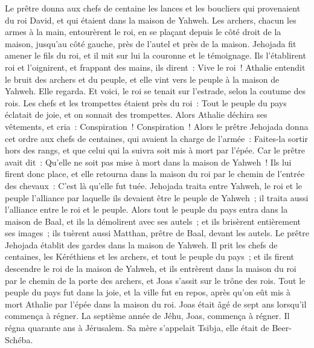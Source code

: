 \begin{multicols}{2}
Le prêtre donna aux chefs de centaine les lances et les boucliers qui provenaient du roi David, et qui étaient dans la maison de Yahweh.
Les archers, chacun les armes à la main, entourèrent le roi, en se plaçant depuis le côté droit de la maison, jusqu'au côté gauche, près de l'autel et près de la maison.
Jehojada fit amener le fils du roi, et il mit sur lui la couronne et le témoignage. Ils l'établirent roi et l'oignirent, et frappant des mains, ils dirent~: Vive le roi~!
Athalie entendit le bruit des archers et du peuple, et elle vint vers le peuple à la maison de Yahweh.
Elle regarda. Et voici, le roi se tenait sur l'estrade, selon la coutume des rois. Les chefs et les trompettes étaient près du roi~: Tout le peuple du pays éclatait de joie, et on sonnait des trompettes. Alors Athalie déchira ses vêtements, et cria~: Conspiration~! Conspiration~!
Alors le prêtre Jehojada donna cet ordre aux chefs de centaines, qui avaient la charge de l'armée~: Faites-la sortir hors des rangs, et que celui qui la suivra soit mis à mort par l'épée. Car le prêtre avait dit~: Qu'elle ne soit pas mise à mort dans la maison de Yahweh~!
Ils lui firent donc place, et elle retourna dans la maison du roi par le chemin de l'entrée des chevaux~: C'est là qu'elle fut tuée.
Jehojada traita entre Yahweh, le roi et le peuple l'alliance par laquelle ils devaient être le peuple de Yahweh~; il traita aussi l'alliance entre le roi et le peuple.
Alors tout le peuple du pays entra dans la maison de Baal, et ils la démolirent avec ses autels~; et ils brisèrent entièrement ses images~; ils tuèrent aussi Matthan, prêtre de Baal, devant les autels. Le prêtre Jehojada établit des gardes dans la maison de Yahweh.
Il prit les chefs de centaines, les Kéréthiens et les archers, et tout le peuple du pays~; et ils firent descendre le roi de la maison de Yahweh, et ils entrèrent dans la maison du roi par le chemin de la porte des archers, et Joas s'assit sur le trône des rois.
Tout le peuple du pays fut dans la joie, et la ville fut en repos, après qu'on eût mis à mort Athalie par l'épée dans la maison du roi.
Joas était âgé de sept ans lorsqu'il commença à régner.
\VerseOne{}La septième année de Jéhu, Joas, commença à régner. Il régna quarante ans à Jérusalem. Sa mère s'appelait Tsibja, elle était de Beer-Schéba.

\end{multicols}
